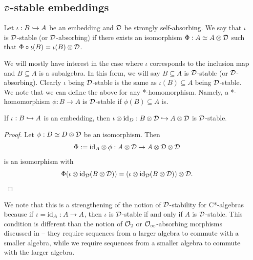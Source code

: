 \documentclass[12pt]{amsart}
\begin{document}
  \subsection{$\mathcal{D}$-stable embeddings}\label{ssection:dse-d-stable-embeddings}

    \begin{defn}
      Let $\iota: B \hookrightarrow A$ be an embedding and $\mathcal{D}$ be strongly self-absorbing. We say that $\iota$ is $\mathcal{D}$-stable (or $\mathcal{D}$-absorbing) if there exists an isomorphism $\Phi:A \simeq A \otimes \mathcal{D}$ such that $\Phi \circ \iota(B) = \iota(B) \otimes \mathcal{D}$. 
    \end{defn}


   We will mostly have interest in the case where $\iota$ corresponds to the inclusion map and $B \subseteq A$ is a subalgebra. In this form, we will say $B \subseteq A$ is $\mathcal{D}$-stable (or $\mathcal{D}$-absorbing). Clearly $\iota$ being $\mathcal{D}$-stable is the same as $\iota(B) \subseteq A$ being $\mathcal{D}$-stable. We note that we can define the above for any *-homomorphism. Namely, a *-homomorphism $\phi:B \to A$ is $\mathcal{D}$-stable if $\phi(B) \subseteq A$ is. 



   \begin{lemma}\label{trivialinclusion}
       If $\iota: B \hookrightarrow A$ is an embedding, then $\iota \otimes \text{id}_D: B \otimes \mathcal{D} \hookrightarrow A \otimes \mathcal{D}$ is $\mathcal{D}$-stable.
         \begin{proof}
           Let $\phi: D \simeq D \otimes \mathcal{D}$ be an isomorphism. Then
\begin{equation}
           \Phi := \text{id}_A \otimes \phi: A \otimes \mathcal{D} \to A \otimes \mathcal{D} \otimes \mathcal{D}
\end{equation}
           is an isomorphism with
\begin{equation}
           \Phi(\iota \otimes \text{id}_{\mathcal{D}}(B \otimes \mathcal{D})) = \left(\iota \otimes \text{id}_{\mathcal{D}}(B \otimes \mathcal{D})\right) \otimes \mathcal{D}.
\end{equation}
         \end{proof}
     \end{lemma}

     We note that this is a strengthening of the notion of $\mathcal{D}$-stability for C*-algebras because if $\iota = \text{id}_A: A \to A$, then $\iota$ is $\mathcal{D}$-stable if and only if $A$ is $\mathcal{D}$-stable. This condition is different than the notion of $\mathcal{O}_2$ or $\mathcal{O}_{\infty}$-absorbing morphisms discussed in \cite{BGSW22,Gabe20,Gabe19} -- they require sequences from a larger algebra to commute with a smaller algebra, while we require sequences from a smaller algebra to commute with the larger algebra.
\end{document}
